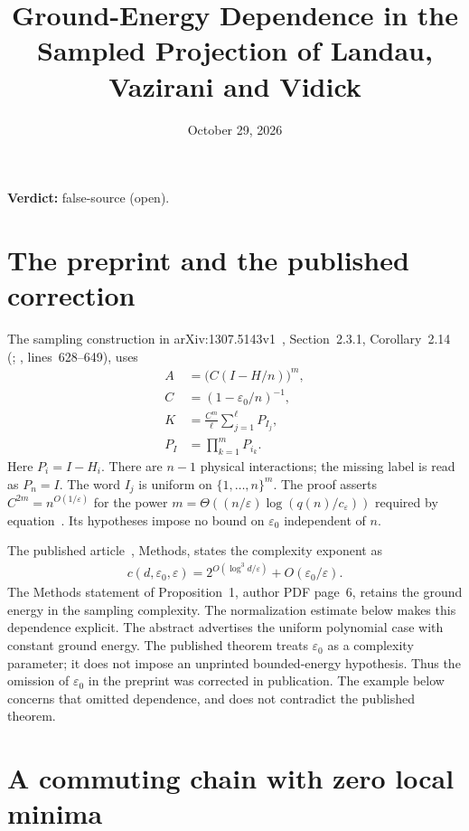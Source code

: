 \documentclass{article}
\title{Ground-Energy Dependence in the Sampled Projection of Landau, Vazirani and Vidick}
\author{}
\date{October 29, 2026}
\providecommand{\gapnote}[2]{\par\noindent\textbf{Verdict:} #1 (#2).\par}
\begin{document}
\maketitle
\gapnote{false-source}{open}

\section{The preprint and the published correction}

The sampling construction in arXiv:1307.5143v1~\cite{Landau2015Polynomial},
Section~2.3.1, Corollary~2.14 (; ,
lines~628--649), uses
\begin{align}
    A   & =\bigl(C(I-H/n)\bigr)^m,                   \\
    C   & =(1-\varepsilon_0/n)^{-1},
    \label{eq:lvv_sampling_power}                    \\
    K   & =\frac{C^m}{\ell}\sum_{j=1}^{\ell}P_{I_j}, \\
    P_I & =\prod_{k=1}^{m}P_{i_k}.
    \label{eq:lvv_sampling_average}
\end{align}
Here $P_i=I-H_i$. There are $n-1$ physical interactions; the missing label is
read as $P_n=I$. The word $I_j$ is uniform on $\{1,\ldots,n\}^m$. The proof asserts
$C^{2m}=n^{O(1/\varepsilon)}$ for the power
$m=\Theta((n/\varepsilon)\log(q(n)/c_\varepsilon))$ required by
equation~. Its hypotheses impose no bound on
$\varepsilon_0$ independent of $n$.

The published article~\cite{Landau2015Published}, Methods, states the
complexity exponent as
\begin{align}
    c(d,\varepsilon_0,\varepsilon)
    =2^{O(\log^3d/\varepsilon)}+O(\varepsilon_0/\varepsilon).
    \label{eq:lvv_sampling_published_exponent}
\end{align}
The Methods statement of Proposition~1, author PDF page~6, retains the
ground energy in the sampling complexity. The normalization estimate below
makes this dependence explicit. The abstract advertises the uniform
polynomial case with constant ground energy.
The published theorem treats $\varepsilon_0$ as a complexity parameter;
it does not impose an unprinted bounded-energy hypothesis. Thus the omission
of $\varepsilon_0$ in the preprint was corrected in publication. The example below concerns that omitted dependence, and does
not contradict the published theorem.

\section{A commuting chain with zero local minima}
\end{document}
